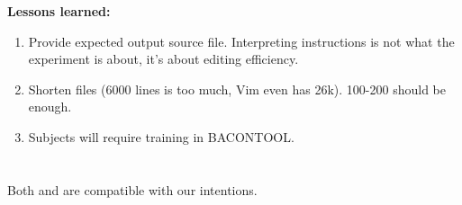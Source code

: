 \textbf{Lessons learned:}
\begin{enumerate}
    \item Provide expected output source file. Interpreting instructions is not what the experiment is about, it's about editing efficiency.
    \item Shorten files (6000 lines is too much, Vim even has 26k). 100-200 should be enough.
    \item Subjects will require training in BACONTOOL.
\end{enumerate}


\section{\RQA}
Both \cite{neves2011evolution} and \cite{passos2016coevolution} are compatible with our intentions.

\section{\RQB}


\section{\RQC}

